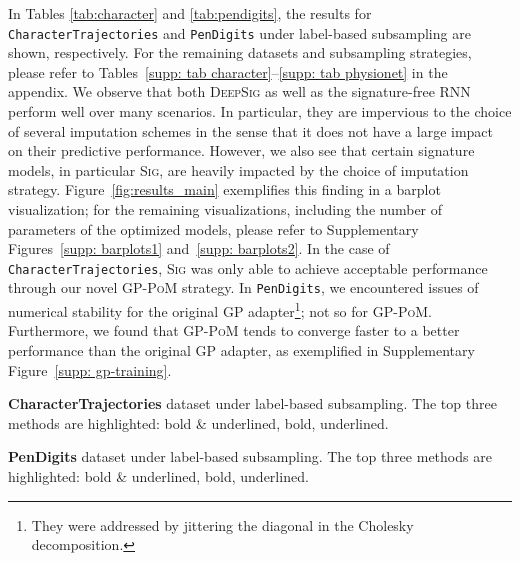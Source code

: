 \documentclass{article}
\begin{document}
In Tables \ref{tab:character} and \ref{tab:pendigits}, the results for
\texttt{CharacterTrajectories} and \texttt{PenDigits} under label-based
subsampling are shown, respectively. For the remaining datasets and
subsampling strategies, please refer to Tables~\ref{supp: tab
character}--\ref{supp: tab physionet} in the appendix. 
%
%
We observe that both \textsc{DeepSig} as well as the signature-free \textsc{RNN} perform well
over many scenarios. In particular, they are impervious to the choice of
several imputation schemes in the sense that it does not have a large
impact on their predictive performance.
%
However, we also see that certain signature models, in particular
\textsc{Sig}, are heavily impacted by the choice of imputation strategy.
Figure~\ref{fig:results_main} exemplifies this finding in a barplot
visualization; for the remaining visualizations, including the number of
parameters of the optimized models, please refer to Supplementary
Figures~\ref{supp: barplots1} and~\ref{supp: barplots2}. In the case of
\texttt{CharacterTrajectories}, \textsc{Sig} was only able to achieve
acceptable performance through our novel \textsc{GP-PoM} strategy. In
\texttt{PenDigits}, we encountered issues of numerical stability for the
original GP adapter\footnote{They were addressed by jittering the
diagonal in the Cholesky decomposition.}; not so for \textsc{GP-PoM}.
Furthermore, we found that \textsc{GP-PoM} tends to converge faster to
a better performance than the original GP adapter, as exemplified in
Supplementary Figure~\ref{supp: gp-training}.

\begin{table}[t]
    \caption{\textbf{CharacterTrajectories} dataset under label-based subsampling. The top three methods are highlighted: bold \& underlined, bold, underlined.}
    \centering
    
    \label{tab:character}
\end{table}

\begin{table}[ht]
    \caption{\textbf{PenDigits} dataset under label-based subsampling. The top three methods are highlighted: bold \& underlined, bold, underlined.}
    \centering
    
    \label{tab:pendigits}
\end{table}
\end{document}
